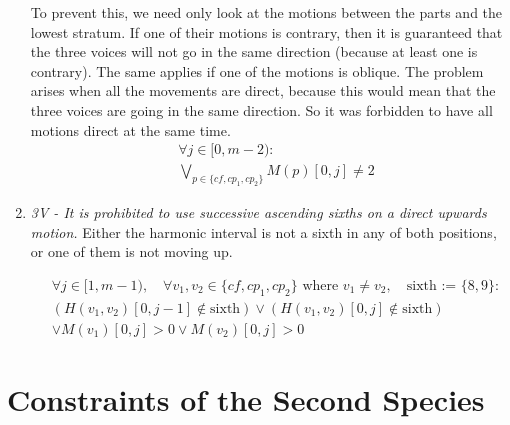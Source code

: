 \begin{enumerate}[wide, label=\bfseries 1.P\arabic*]
    To prevent this, we need only look at the motions between the parts and the lowest stratum. If one of their motions is contrary, then it is guaranteed that the three voices will not go in the same direction (because at least one is contrary). The same applies if one of the motions is oblique. The problem arises when all the movements are direct, because this would mean that the three voices are going in the same direction. So it was forbidden to have all motions direct at the same time.
    \begin{equation} \begin{aligned}
    &\forall j \in [0, m-2) \colon\\
    &\bigvee_{p \in \{\mathit{cf}, cp_1, cp_2\}}  M(p)[0, j] \neq 2
    \end{aligned} \end{equation}

    \item  \textit{3V - It is prohibited to use successive ascending sixths on a direct upwards motion.}
    Either the harmonic interval is not a sixth in any of both positions, or one of them is not moving up.

    \begin{equation}
        \begin{aligned}
            & \forall j \in [1, m-1), \quad \forall v_1, v_2 \in \{\mathit{cf}, cp_1, cp_2\} \text{ where } v_1 \neq v_2, \quad \text{sixth := } \{8,9\} \colon \\
            & (H(v_1, v_2)[0, j-1] \notin \text{sixth}) \lor (H(v_1, v_2)[0, j] \notin \text{sixth}) \\
            & \lor M(v_1)[0, j] > 0 \lor M(v_2)[0, j] > 0
        \end{aligned}
        \end{equation}

\end{enumerate}

\section*{Constraints of the Second Species}
